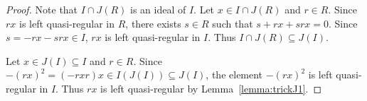 \begin{proof}
	Note that $I\cap J(R)$ is an ideal of $I$. Let $x\in I\cap J(R)$ and $r\in R$. 
        Since $rx$ is left quasi-regular in $R$, there exists $s\in R$ such that $s+rx+srx=0$. 
	Since $s=-rx-srx\in I$, $rx$ is left quasi-regular 
	in $I$. Thus $I\cap J(R)\subseteq J(I)$. 

	Let $x\in J(I)\subseteq I$ and $r\in R$. Since $-(rx)^2=(-rxr)x\in
	I(J(I))\subseteq J(I)$, the element $-(rx)^2$ is left quasi-regular 
	in $I$. Thus $rx$ is left quasi-regular by
	Lemma~\ref{lemma:trickJ1}.
\end{proof}

